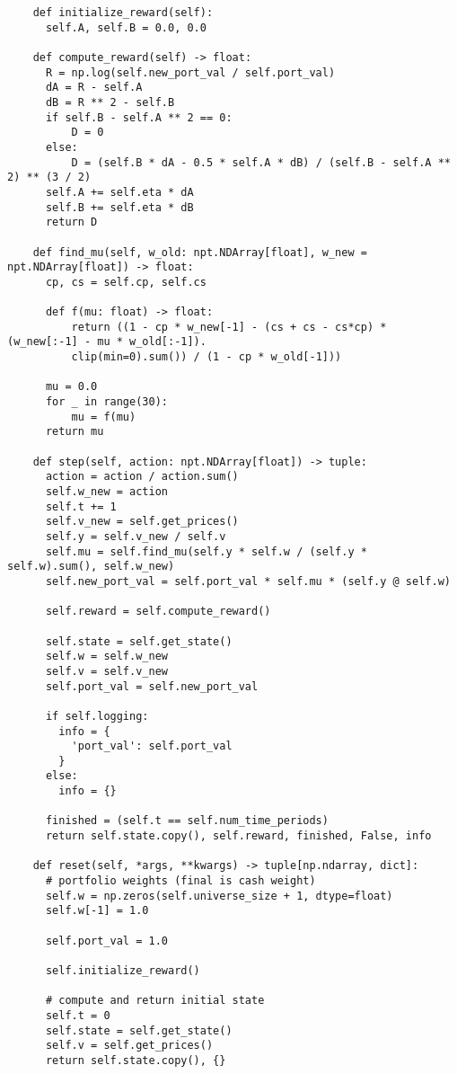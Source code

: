 \begin{verbatim}
    def initialize_reward(self):
      self.A, self.B = 0.0, 0.0

    def compute_reward(self) -> float:
      R = np.log(self.new_port_val / self.port_val)
      dA = R - self.A
      dB = R ** 2 - self.B
      if self.B - self.A ** 2 == 0:
          D = 0
      else:
          D = (self.B * dA - 0.5 * self.A * dB) / (self.B - self.A ** 2) ** (3 / 2)
      self.A += self.eta * dA
      self.B += self.eta * dB
      return D

    def find_mu(self, w_old: npt.NDArray[float], w_new = npt.NDArray[float]) -> float:
      cp, cs = self.cp, self.cs

      def f(mu: float) -> float:
          return ((1 - cp * w_new[-1] - (cs + cs - cs*cp) * (w_new[:-1] - mu * w_old[:-1]).
          clip(min=0).sum()) / (1 - cp * w_old[-1]))

      mu = 0.0
      for _ in range(30):
          mu = f(mu)
      return mu

    def step(self, action: npt.NDArray[float]) -> tuple:
      action = action / action.sum()
      self.w_new = action
      self.t += 1
      self.v_new = self.get_prices()
      self.y = self.v_new / self.v
      self.mu = self.find_mu(self.y * self.w / (self.y * self.w).sum(), self.w_new)
      self.new_port_val = self.port_val * self.mu * (self.y @ self.w)

      self.reward = self.compute_reward()

      self.state = self.get_state()
      self.w = self.w_new
      self.v = self.v_new
      self.port_val = self.new_port_val

      if self.logging:
        info = {
          'port_val': self.port_val
        }
      else:
        info = {}

      finished = (self.t == self.num_time_periods)
      return self.state.copy(), self.reward, finished, False, info

    def reset(self, *args, **kwargs) -> tuple[np.ndarray, dict]:
      # portfolio weights (final is cash weight)
      self.w = np.zeros(self.universe_size + 1, dtype=float)
      self.w[-1] = 1.0

      self.port_val = 1.0

      self.initialize_reward()

      # compute and return initial state
      self.t = 0
      self.state = self.get_state()
      self.v = self.get_prices()
      return self.state.copy(), {}
\end{verbatim}

